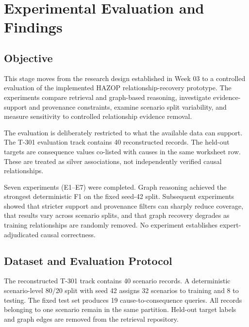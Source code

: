 %

\chapter[Experimental Evaluation and Findings]
{Experimental Evaluation and Findings}

\section{Objective}

This stage moves from the research design established in Week 03 to a
controlled evaluation of the implemented HAZOP relationship-recovery
prototype. The experiments compare retrieval and graph-based reasoning,
investigate evidence-support and provenance constraints, examine scenario
split variability, and measure sensitivity to controlled relationship
evidence removal.

The evaluation is deliberately restricted to what the available data can
support. The T-301 evaluation track contains 40 reconstructed records. The
held-out targets are consequence values co-listed with causes in the same
worksheet row. These are treated as silver associations, not independently
verified causal relationships.

\begin{glance}
Seven experiments (E1--E7) were completed. Graph reasoning achieved the
strongest deterministic F1 on the fixed seed-42 split. Subsequent experiments
showed that stricter support and provenance filters can sharply reduce
coverage, that results vary across scenario splits, and that graph recovery
degrades as training relationships are randomly removed. No experiment
establishes expert-adjudicated causal correctness.
\end{glance}

\section{Dataset and Evaluation Protocol}

The reconstructed T-301 track contains 40 scenario records. A deterministic
scenario-level 80/20 split with seed 42 assigns 32 scenarios to training and
8 to testing. The fixed test set produces 19 cause-to-consequence queries.
All records belonging to one scenario remain in the same partition. Held-out
target labels and graph edges are removed from the retrieval repository.

